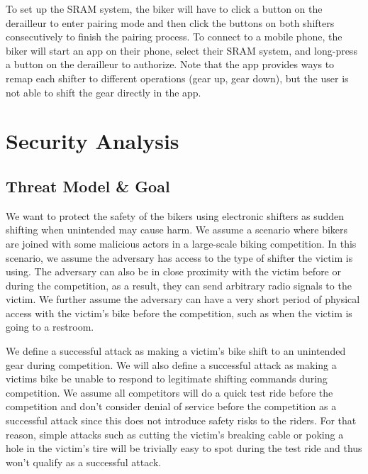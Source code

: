 \documentclass[letterpaper,twocolumn,10pt]{article}
\begin{document}
To set up the SRAM system, the biker will have to click a button on the derailleur to enter pairing mode and then click the buttons on both shifters consecutively to finish the pairing process. To connect to a mobile phone, the biker will start an app on their phone, select their SRAM system, and long-press a button on the derailleur to authorize. Note that the app provides ways to remap each shifter to different operations (gear up, gear down), but the user is not able to shift the gear directly in the app.




\section{Security Analysis}



\subsection{Threat Model \& Goal}
We want to protect the safety of the bikers using electronic shifters as sudden shifting when unintended may cause harm. We assume a scenario where bikers are joined with some malicious actors in a large-scale biking competition. In this scenario, we assume the adversary has access to the type of shifter the victim is using. The adversary can also be in close proximity with the victim before or during the competition, as a result, they can send arbitrary radio signals to the victim. We further assume the adversary can have a very short period of physical access with the victim's bike before the competition, such as when the victim is going to a restroom.

We define a successful attack as making a victim's bike shift to an unintended gear during competition. We will also define a successful attack as making a victims bike be unable to respond to legitimate shifting commands during competition. We assume all competitors will do a quick test ride before the competition and don't consider denial of service before the competition as a successful attack since this does not introduce safety risks to the riders. For that reason, simple attacks such as cutting the victim's breaking cable or poking a hole in the victim's tire will be trivially easy to spot during the test ride and thus won't qualify as a successful attack.
\end{document}
